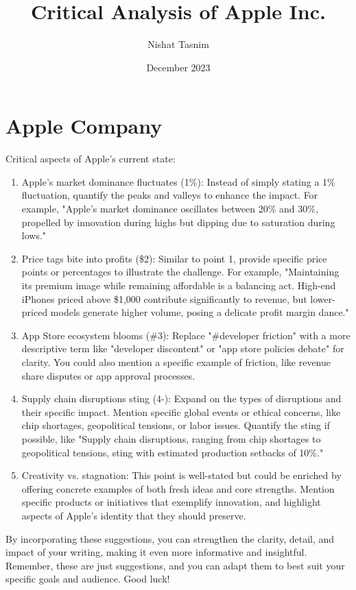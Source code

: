 \documentclass{article}
\title{Critical Analysis of Apple Inc.}
\author{Nishat Tasnim}
\date{December 2023}
\begin{document}
\maketitle

\section{Apple Company}

Critical aspects of Apple's current state:

\begin{enumerate}
    \item Apple's market dominance fluctuates (1\%): Instead of simply stating a 1\% fluctuation, quantify the peaks and valleys to enhance the impact. For example, "Apple's market dominance oscillates between 20\% and 30\%, propelled by innovation during highs but dipping due to saturation during lows."
    
    \item Price tags bite into profits (\$2): Similar to point 1, provide specific price points or percentages to illustrate the challenge. For example, "Maintaining its premium image while remaining affordable is a balancing act. High-end iPhones priced above \$1,000 contribute significantly to revenue, but lower-priced models generate higher volume, posing a delicate profit margin dance."
    
    \item App Store ecosystem blooms (\#3): Replace "\#developer friction" with a more descriptive term like "developer discontent" or "app store policies debate" for clarity. You could also mention a specific example of friction, like revenue share disputes or app approval processes.
    
    \item Supply chain disruptions sting (4-): Expand on the types of disruptions and their specific impact. Mention specific global events or ethical concerns, like chip shortages, geopolitical tensions, or labor issues. Quantify the sting if possible, like "Supply chain disruptions, ranging from chip shortages to geopolitical tensions, sting with estimated production setbacks of 10\%."
    
    \item Creativity vs. stagnation: This point is well-stated but could be enriched by offering concrete examples of both fresh ideas and core strengths. Mention specific products or initiatives that exemplify innovation, and highlight aspects of Apple's identity that they should preserve.
\end{enumerate} By incorporating these suggestions, you can strengthen the clarity, detail, and impact of your writing, making it even more informative and insightful. Remember, these are just suggestions, and you can adapt them to best suit your specific goals and audience. Good luck! 
\end{document}
